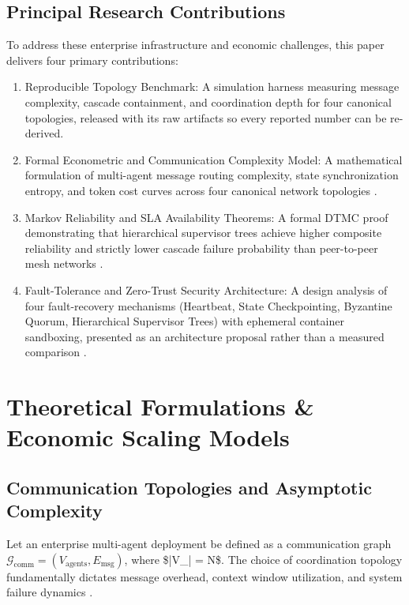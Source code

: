 \documentclass[11pt,a4paper]{article}
\begin{document}
\subsection{Principal Research Contributions}


To address these enterprise infrastructure and economic challenges, this paper delivers four primary contributions:
\begin{enumerate}
  \item Reproducible Topology Benchmark: A simulation harness measuring message complexity, cascade containment, and coordination depth for four canonical topologies, released with its raw artifacts so every reported number can be re-derived.
  \item Formal Econometric and Communication Complexity Model: A mathematical formulation of multi-agent message routing complexity, state synchronization entropy, and token cost curves across four canonical network topologies \cite{arxiv_2404_01131,arxiv_2203_08975}.
  \item Markov Reliability and SLA Availability Theorems: A formal DTMC proof demonstrating that hierarchical supervisor trees achieve higher composite reliability and strictly lower cascade failure probability than peer-to-peer mesh networks \cite{arxiv_2010_11146,arxiv_2412_06333}.
  \item Fault-Tolerance and Zero-Trust Security Architecture: A design analysis of four fault-recovery mechanisms (Heartbeat, State Checkpointing, Byzantine Quorum, Hierarchical Supervisor Trees) with ephemeral container sandboxing, presented as an architecture proposal rather than a measured comparison \cite{arxiv_2404_04289,openalex_w4400578758}.
\end{enumerate}




\section{Theoretical Formulations \& Economic Scaling Models}



\subsection{Communication Topologies and Asymptotic Complexity}


Let an enterprise multi-agent deployment be defined as a communication graph $\mathcal{G}_{\text{comm}} = (V_{\text{agents}}, E_{\text{msg}})$, where \$|V\_{}| = N\$. The choice of coordination topology fundamentally dictates message overhead, context window utilization, and system failure dynamics \cite{arxiv_2203_08975}.
\end{document}
